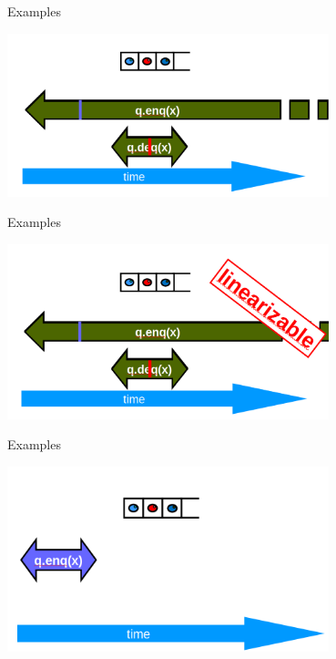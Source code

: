 \begin{frame}{Examples}
\begin{center} \includegraphics[width=0.7\textwidth]{./pics/linear/74.png} \end{center}
\end{frame}

\begin{frame}{Examples}
\begin{center} \includegraphics[width=0.7\textwidth]{./pics/linear/75.png} \end{center}
\end{frame}

\begin{frame}{Examples}
\begin{center} \includegraphics[width=0.7\textwidth]{./pics/linear/76.png} \end{center}
\end{frame}

